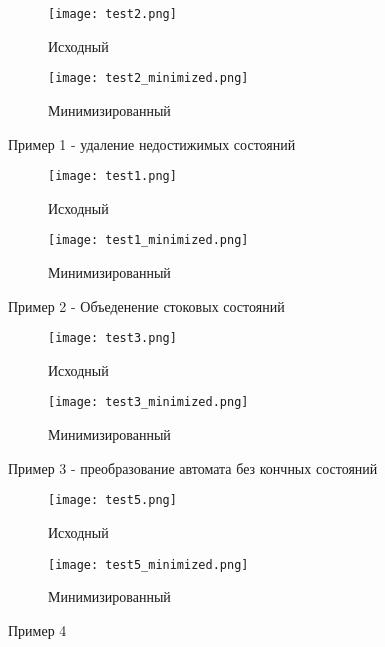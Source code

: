 \begin{figure}[h]
    \centering
    \begin{subfigure}[b]{0.4\linewidth}
      \texttt{[image: test2.png]}
      \caption{Исходный}
    \end{subfigure}
    \begin{subfigure}[b]{0.4\linewidth}
      \texttt{[image: test2\_minimized.png]}
      \caption{Минимизированный}
    \end{subfigure}
    \caption{Пример 1 - удаление недостижимых состояний}
\end{figure}

\begin{figure}[h]
    \centering
    \begin{subfigure}[b]{0.6\linewidth}
      \texttt{[image: test1.png]}
      \caption{Исходный}
    \end{subfigure}
    \begin{subfigure}[b]{0.3\linewidth}
      \texttt{[image: test1\_minimized.png]}
      \caption{Минимизированный}
    \end{subfigure}
    \caption{Пример 2 - Объеденение стоковых состояний}
\end{figure}

\begin{figure}[h]
    \centering
    \begin{subfigure}[b]{0.6\linewidth}
      \texttt{[image: test3.png]}
      \caption{Исходный}
    \end{subfigure}
    \begin{subfigure}[b]{0.3\linewidth}
      \texttt{[image: test3\_minimized.png]}
      \caption{Минимизированный}
    \end{subfigure}
    \caption{Пример 3 - преобразование автомата без кончных состояний}
\end{figure}

\begin{figure}[h]
    \centering
    \begin{subfigure}[b]{0.8\linewidth}
      \texttt{[image: test5.png]}
      \caption{Исходный}
    \end{subfigure}
    \begin{subfigure}[b]{0.6\linewidth}
      \texttt{[image: test5\_minimized.png]}
      \caption{Минимизированный}
    \end{subfigure}
    \caption{Пример 4}
\end{figure}